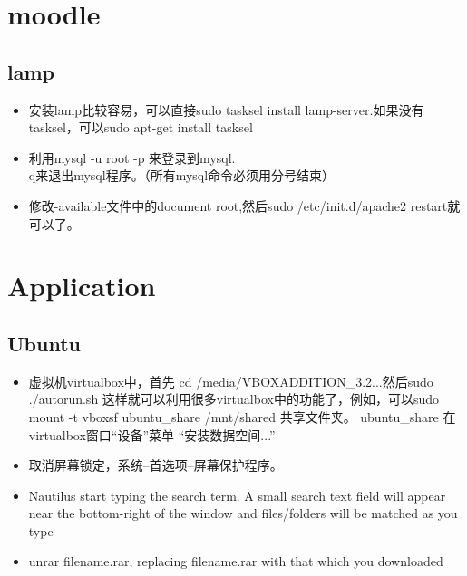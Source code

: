 \documentclass[a4paper,12pt,twoside]{book}
\begin{document}
\begin{CJK*}{UTF8}{song}
\chapter{moodle}
\section{lamp}
\begin{itemize}
\item 安装lamp比较容易，可以直接sudo tasksel install lamp-server.如果没有tasksel，可以sudo apt-get install tasksel
\item 利用mysql -u root -p 来登录到mysql. \\q来退出mysql程序。（所有mysql命令必须用分号结束）
\item 修改\etc{}\sites-available 文件中的document root,然后sudo /etc/init.d/apache2 restart就可以了。

\end{itemize}

\chapter{Application}
\section{Ubuntu}
		\begin{itemize}
		\item 虚拟机virtualbox中，首先 cd /media/VBOXADDITION_3.2...然后sudo ./autorun.sh 
这样就可以利用很多virtualbox中的功能了，例如，可以sudo mount -t vboxsf ubuntu_share /mnt/shared 共享文件夹。
ubuntu_share 在virtualbox窗口“设备”菜单 “安装数据空间...”
		\item 取消屏幕锁定，系统--首选项--屏幕保护程序。
		\item Nautilus start typing the search term. A small search text field will appear near the bottom-right of the window and files/folders will be matched as you type
		\item unrar  filename.rar, replacing filename.rar with that which you downloaded
		

\end{itemize}
\end{CJK*}
\end{document}
